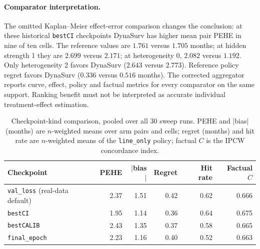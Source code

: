 \paragraph{Comparator interpretation.} The omitted Kaplan--Meier effect-error comparison
changes the conclusion: at these historical \texttt{bestCI} checkpoints DynaSurv has higher
mean pair PEHE in nine of ten cells. The reference values are $1.761$ versus $1.705$ months;
at hidden strength 1 they are $2.699$ versus $2.171$; at heterogeneity 0, $2.082$ versus
$1.192$. Only heterogeneity 2 favors DynaSurv ($2.643$ versus $2.773$). Reference policy
regret favors DynaSurv ($0.336$ versus $0.516$ months). The corrected aggregator reports
curve, effect, policy and factual metrics for every comparator on the same support. Ranking
benefit must not be interpreted as accurate individual treatment-effect estimation.

\begin{table}[ht]
\centering\small
\caption{Checkpoint-kind comparison, pooled over all 30 sweep runs. PEHE and $|$bias$|$
(months) are $n$-weighted means over arm pairs and cells; regret (months) and hit rate are
$n$-weighted means of the \texttt{line\_only} policy; factual $C$ is the IPCW concordance index.}
\label{tab:semisynthetic:checkpoint}
\begin{tabular}{@{}lrrrrr@{}}
\toprule
Checkpoint & PEHE & $|$bias$|$ & Regret & Hit rate & Factual $C$ \\
\midrule
\texttt{val\_loss} (real-data default) & 2.37 & 1.51 & 0.42 & 0.62 & 0.666 \\
\texttt{bestCI} & 1.95 & 1.14 & 0.36 & 0.64 & 0.675 \\
\texttt{bestCALIB} & 2.43 & 1.35 & 0.37 & 0.58 & 0.665 \\
\texttt{final\_epoch} & 2.23 & 1.16 & 0.40 & 0.52 & 0.663 \\
\bottomrule
\end{tabular}
\end{table}

